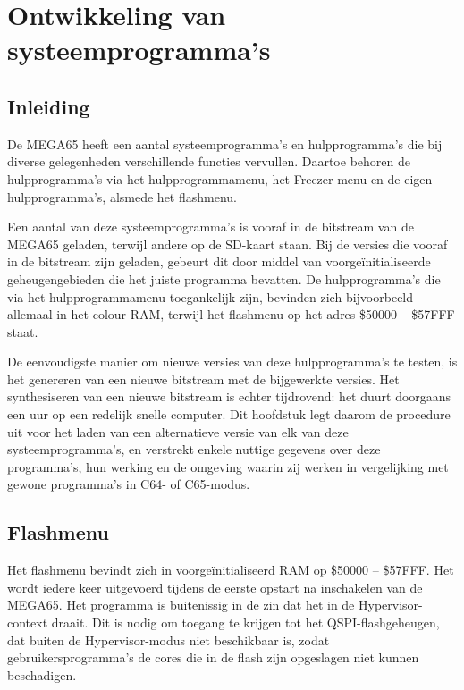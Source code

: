 \chapter{Ontwikkeling van systeemprogramma's}

\section{Inleiding}

De MEGA65 heeft een aantal systeemprogramma's en hulpprogramma's die bij diverse gelegenheden verschillende functies vervullen. Daartoe behoren de hulpprogramma's via het hulpprogrammamenu, het Freezer-menu en de eigen hulpprogramma's, alsmede het flashmenu.

Een aantal van deze systeemprogramma's is vooraf in de bitstream van de MEGA65 geladen, terwijl andere op de SD-kaart staan. Bij de versies die vooraf in de bitstream zijn geladen, gebeurt dit door middel van voorgeïnitialiseerde geheugengebieden die het juiste programma bevatten. De hulpprogramma's die via het hulpprogrammamenu toegankelijk zijn, bevinden zich bijvoorbeeld allemaal in het colour RAM, terwijl het flashmenu op het adres \$50000 -- \$57FFF staat.

De eenvoudigste manier om nieuwe versies van deze hulpprogramma's te testen, is het genereren van een nieuwe bitstream met de bijgewerkte versies. Het synthesiseren van een nieuwe bitstream is echter tijdrovend: het duurt doorgaans een uur op een redelijk snelle computer. Dit hoofdstuk legt daarom de procedure uit voor het laden van een alternatieve versie van elk van deze systeemprogramma's, en verstrekt enkele nuttige gegevens over deze programma's, hun werking en de omgeving waarin zij werken in vergelijking met gewone programma's in C64- of C65-modus.

\section{Flashmenu}

Het flashmenu bevindt zich in voorgeïnitialiseerd RAM op \$50000 -- \$57FFF. Het wordt iedere keer uitgevoerd tijdens de eerste opstart na inschakelen van de MEGA65. Het programma is buitenissig in de zin dat het in de Hypervisor-context draait. Dit is nodig om toegang te krijgen tot het QSPI-flashgeheugen, dat buiten de Hypervisor-modus niet beschikbaar is, zodat gebruikersprogramma's de cores die in de flash zijn opgeslagen niet kunnen beschadigen.

